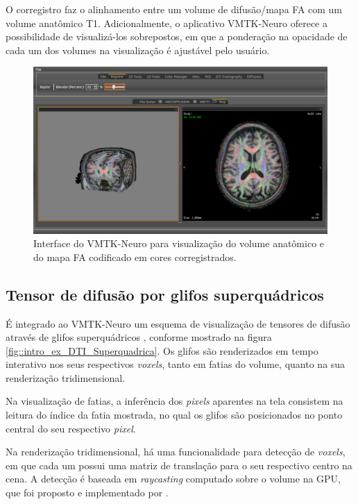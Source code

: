 \documentclass[
    12pt,                %
    oneside,            %
    a4paper,            %
    english,            %
    french,                %
    spanish,            %
    brazil                %
    ]{abntex2}
\begin{document}
O corregistro faz o alinhamento entre um volume de difusão/mapa FA com um volume anatômico T1. Adicionalmente, o aplicativo VMTK-Neuro oferece a possibilidade de visualizá-los sobrepostos, em que a ponderação na opacidade de cada um dos volumes na visualização é ajustável pelo usuário.

\begin{figure}[H]
\centering
\includegraphics[scale = 0.3]{figs/Exemplo_Trabalhos_Relacionados/corregistro.png}
\caption{Interface do VMTK-Neuro para visualização do volume anatômico e do mapa FA codificado em cores corregistrados.}
\label{corregistroFAT1}
\end{figure}

\subsection{Tensor de difusão por glifos superquádricos}
\label{ssec::supequadricos}

É integrado ao VMTK-Neuro um esquema de visualização de tensores de difusão através de glifos superquádricos \cite{Kindlmann2004}, conforme mostrado na figura \ref{fig::intro_ex_DTI_Superquadrica}. Os glifos são renderizados em tempo interativo nos seus respectivos \textit{voxels}, tanto em fatias do volume, quanto na sua renderização tridimensional.

Na visualização de fatias, a inferência dos \textit{pixels} aparentes na tela consistem na leitura do índice da fatia mostrada, no qual os glifos são posicionados no ponto central do seu respectivo \textit{pixel}.

Na renderização tridimensional, há uma funcionalidade para detecção de \textit{voxels}, em que cada um possui uma matriz de translação para o seu respectivo centro na cena. A detecção é baseada em \textit{raycasting} computado sobre o volume na GPU, que foi proposto e implementado por .
\end{document}
